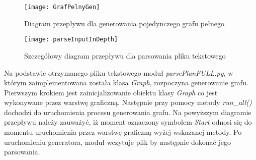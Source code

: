     \begin{figure}
        \texttt{[image: GrafPelnyGen]}
        \centering
        \caption{Diagram przepływu dla generowania pojedynczego grafu pełnego}
    \end{figure}

    \begin{figure}
        \texttt{[image: parseInputInDepth]}
        \centering
        \caption{Szczegółowy diagram przepływu dla parsowania pliku tekstowego}
    \end{figure}

    Na podstawie otrzymanego pliku tekstowego moduł \textit{parsePlanFULL.py}, w którym zaimplementowana została klasa \textit{Graph},
    rozpoczyna generowanie grafu. Pierwszym krokiem jest zainicjalizowanie obiektu klasy \textit{Graph} co jest wykonywane przez warstwę graficzną.
    Następnie przy pomocy metody \textit{run\_all()} dochodzi do uruchomienia procesu generowania grafu. Na powyższym diagramie przepływu należy 
    zauważyć, iż moment oznaczony symbolem \textit{Start} odnosi się do momentu uruchomienia przez warstwę graficzną wyżej wskazanej metody.
    Po uruchomieniu generatora, moduł wczytuje plik by następnie dokonać jego parsowania.

